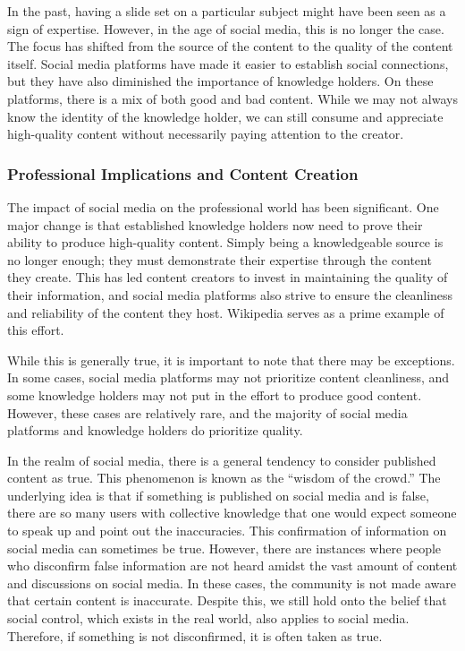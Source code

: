 In the past, having a slide set on a particular subject might have been
seen as a sign of expertise. However, in the age of social media, this
is no longer the case. The focus has shifted from the source of the
content to the quality of the content itself. Social media platforms
have made it easier to establish social connections, but they have also
diminished the importance of knowledge holders. On these platforms,
there is a mix of both good and bad content. While we may not always
know the identity of the knowledge holder, we can still consume and
appreciate high-quality content without necessarily paying attention to
the creator.

\subsubsection{Professional Implications and Content
    Creation}\label{professional-implications-and-content-creation}

The impact of social media on the professional world has been
significant. One major change is that established knowledge holders now
need to prove their ability to produce high-quality content. Simply
being a knowledgeable source is no longer enough; they must demonstrate
their expertise through the content they create. This has led content
creators to invest in maintaining the quality of their information, and
social media platforms also strive to ensure the cleanliness and
reliability of the content they host. Wikipedia serves as a prime
example of this effort.

While this is generally true, it is important to note that there may be
exceptions. In some cases, social media platforms may not prioritize
content cleanliness, and some knowledge holders may not put in the
effort to produce good content. However, these cases are relatively
rare, and the majority of social media platforms and knowledge holders
do prioritize quality.

In the realm of social media, there is a general tendency to consider
published content as true. This phenomenon is known as the ``wisdom of
the crowd.'' The underlying idea is that if something is published on
social media and is false, there are so many users with collective
knowledge that one would expect someone to speak up and point out the
inaccuracies. This confirmation of information on social media can
sometimes be true. However, there are instances where people who
disconfirm false information are not heard amidst the vast amount of
content and discussions on social media. In these cases, the community
is not made aware that certain content is inaccurate. Despite this, we
still hold onto the belief that social control, which exists in the real
world, also applies to social media. Therefore, if something is not
disconfirmed, it is often taken as true.

